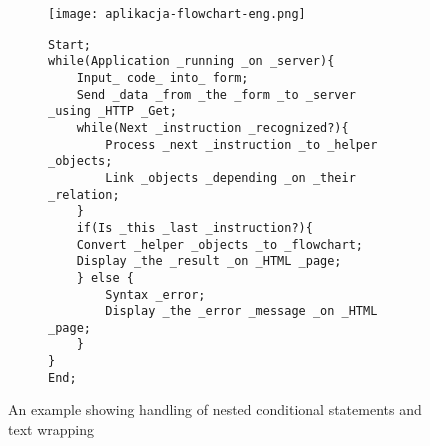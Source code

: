 \begin{figure}[H]
  \begin{subfigure}{\textwidth}
    \centering
    \texttt{[image: aplikacja-flowchart-eng.png]}
  \end{subfigure}\hfill
  \begin{subfigure}[t]{0.44\textwidth}
    \begin{verbatim}
Start;
while(Application _running _on _server){
    Input_ code_ into_ form;
    Send _data _from _the _form _to _server _using _HTTP _Get;
    while(Next _instruction _recognized?){
        Process _next _instruction _to _helper _objects;
        Link _objects _depending _on _their _relation;
    }
    if(Is _this _last _instruction?){
    Convert _helper _objects _to _flowchart;
    Display _the _result _on _HTML _page;
    } else {
        Syntax _error;
        Display _the _error _message _on _HTML _page;
    }
}
End;
    \end{verbatim}
  \end{subfigure}%
  \caption{An example showing handling of nested conditional statements and text wrapping}
\end{figure}